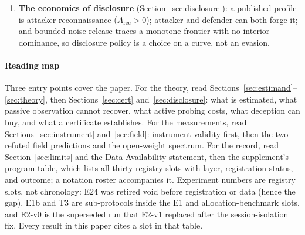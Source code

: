\begin{enumerate}[leftmargin=*,itemsep=1pt,topsep=2pt]
every measured turn under a $300$-session probe attack ($\hat\beta=0$, Holm
bounds $0.0996/0.1136$, both below $\tau$), and five attacker personas hold
their operational beliefs under live honeypot deception. The instrument's own
floor did half the work: Proposition~\ref{prop:censor}'s censoring rule
flagged the state-deception family, a registered decomposition traced its
zero to a $200$-token budget, and the mandatory transcript audit retracted
the repaired panel's five flags as refusal-quote false positives. An
open-weight panel then extended the measurement to verifiable models, where
the spectrum's axis is literal canary echo---$0.000$ on the gateway against
$0.030$--$0.143$ pooled ($0.700$ in the echo family)---with zero
destructive-command compliance in any panel.

\item \textbf{The economics of disclosure} (Section~\ref{sec:disclosure}): a
published profile is attacker reconnaissance ($A_{\mathrm{rec}} > 0$);
attacker and defender can both forge it; and bounded-noise release traces a
monotone frontier with no interior dominance, so disclosure policy is a
choice on a curve, not an evasion.
\end{enumerate}

\paragraph{Reading map}
Three entry points cover the paper. For the theory, read
Sections~\ref{sec:estimand}--\ref{sec:theory}, then
Sections~\ref{sec:cert} and~\ref{sec:disclosure}: what is estimated, what
passive observation cannot recover, what active probing costs, what deception
can buy, and what a certificate establishes. For the measurements, read
Sections~\ref{sec:instrument} and~\ref{sec:field}: instrument validity first,
then the two refuted field predictions and the open-weight spectrum. For the
record, read Section~\ref{sec:limits} and the Data Availability statement, then
the supplement's program table, which lists all thirty registry slots with
layer, registration status, and outcome; a notation roster accompanies it.
Experiment numbers are registry slots, not chronology: E24 was retired void
before registration or data (hence the gap), E1b and T3 are sub-protocols
inside the E1 and allocation-benchmark slots, and E2-v0 is the superseded run
that E2-v1 replaced after the session-isolation fix. Every result in this paper
cites a slot in that table.


